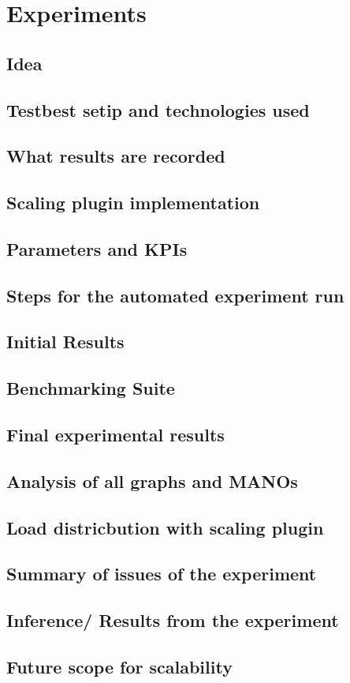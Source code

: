 \section{Experiments}

\subsection{Idea}  
\subsection{Testbest setip and technologies used}
\subsection{What results are recorded} 
\subsection{Scaling plugin implementation}   
\subsection{Parameters and KPIs} 
\subsection{Steps for the automated experiment run} 
\subsection{Initial Results} 
\subsection{Benchmarking Suite} 
\subsection{Final experimental results} 
\subsection{Analysis of all graphs and MANOs} 
\subsection{Load districbution with scaling plugin} 
\subsection{Summary of issues of the experiment} 
\subsection{Inference/ Results from the experiment} 
\subsection{Future scope for scalability} 
      
    
  